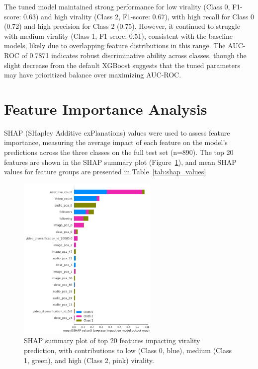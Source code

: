 \documentclass[12pt,a4paper]{report}
\begin{document}
The tuned model maintained strong performance for low virality (Class 0, F1-score: 0.63) and high virality (Class 2, F1-score: 0.67), with high recall for Class 0 (0.72) and high precision for Class 2 (0.75). However, it continued to struggle with medium virality (Class 1, F1-score: 0.51), consistent with the baseline models, likely due to overlapping feature distributions in this range. The AUC-ROC of 0.7871 indicates robust discriminative ability across classes, though the slight decrease from the default XGBoost suggests that the tuned parameters may have prioritized balance over maximizing AUC-ROC.
\newpage
\section{Feature Importance Analysis}
SHAP (SHapley Additive exPlanations) values were used to assess feature importance, measuring the average impact of each feature on the model’s predictions across the three classes on the full test set (n=890). The top 20 features are shown in the SHAP summary plot (Figure~\ref{fig:shap_summary}), and mean SHAP values for feature groups are presented in Table~\ref{tab:shap_values}

\begin{figure}[h]
    \centering
    \includegraphics[width=0.60\textwidth]{figures/RQ1/SHAP_first_test_Plot.png}
    \caption{SHAP summary plot of top 20 features impacting virality prediction, with contributions to low (Class 0, blue), medium (Class 1, green), and high (Class 2, pink) virality.}
    \label{fig:shap_summary}
\end{figure}
\end{document}
